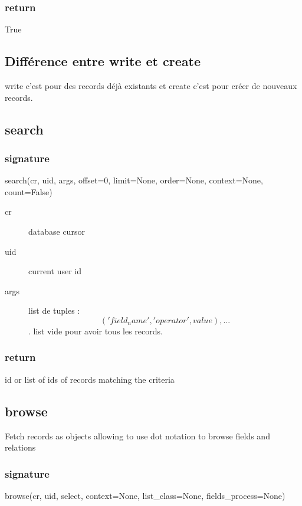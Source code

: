 \documentclass[12pt,a4paper]{article}
\begin{document}
\subsubsection{return}
\label{sec:ret_write}

True

\subsection{Différence entre write et create}
\label{sec:diff_write_create}

write c'est pour des records déjà existants et create c'est pour créer de nouveaux records.

\subsection{search}
\label{sec:search}

\subsubsection{signature}
\label{sec:signature}
search(cr, uid, args, offset=0, limit=None, order=None, context=None, count=False)

\begin{description}
\item[cr] database cursor
\item[uid] current user id
\item[args] list de tuples : \[('field_name', 'operator', value), ...\]. list vide pour avoir tous les records.
\end{description}

\subsubsection{return}
\label{sec:return}
id or list of ids of records matching the criteria

\subsection{browse}
\label{sec:browse_method}
Fetch records as objects allowing to use dot notation to browse fields and relations
\subsubsection{signature}
\label{sec:browse_sig}

browse(cr, uid, select, context=None, list\_class=None, fields\_process=None)
\end{document}
